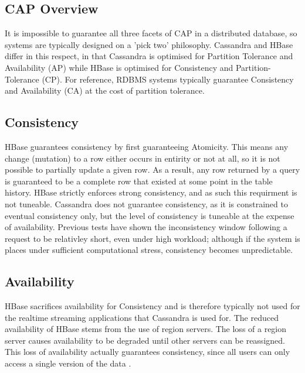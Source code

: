 \documentclass[10pt]{article}
\begin{document}
\subsection{CAP Overview}
It is impossible to guarantee all three facets of CAP in a distributed database, so systems are typically designed on a 'pick two' philosophy. Cassandra and HBase differ in this respect, in that Cassandra is optimised for Partition Tolerance and Availability (AP) while HBase is optimised for Consistency and Partition-Tolerance (CP). For reference, RDBMS systems typically guarantee Consistency and Availability (CA) at the cost of partition tolerance.

\subsection{Consistency}
HBase guarantees consistency by first guaranteeing Atomicity. This means any change (mutation) to a row either occurs in entirity or not at all, so it is not possible to partially update a given row. As a result, any row returned by a query is guaranteed to be a complete row that existed at some point in the table history. HBase strictly enforces strong consistency, and as such this requirment is not tuneable. Cassandra does not guarantee consistency, as it is constrained to eventual consistency only, but the level of consistency is tuneable at the expense of availability. Previous tests have shown the inconsistency window following a request to be relativley short, even under high workload; although if the system is places under sufficient computational stress, consistency becomes unpredictable. \cite{10.1007/978-3-319-04936-6_3}

\subsection{Availability}
HBase sacrifices availability for Consistency and is therefore typically not used for the realtime streaming applications that Cassandra is used for. The reduced availability of HBase stems from the use of region servers. The loss of a region server causes availability to be degraded until other servers can be reassigned. This loss of availability actually guarantees consistency, since all users can only access a single version of the data \cite{6885425}.

% 
% 
% 
% 
\end{document}
